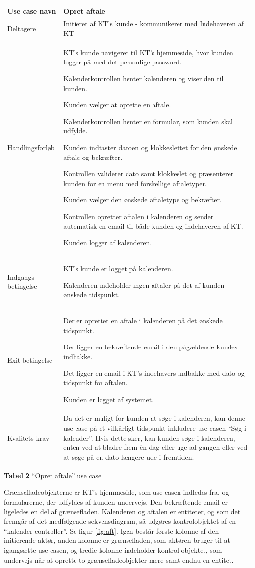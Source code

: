 \documentclass[12pt]{article}   %
\newcommand{\nextitem}{\par\hspace*{\labelsep}\textbullet\hspace*{\labelsep}}
\begin{document}
\begin{tabular}{l p{10cm}}
Use case navn & Opret aftale \\ \hline
Deltagere & \nextitem Initieret af KT's kunde
            - kommunikerer med Indehaveren af KT\\ \hline
Handlingsforløb &
	\nextitem KT's kunde navigerer til KT's hjemmeside, hvor kunden logger
	på med det personlige password.
	\nextitem Kalenderkontrollen henter kalenderen og viser den til
	kunden.
	\nextitem Kunden vælger at oprette en aftale.
	\nextitem Kalenderkontrollen henter en formular, som kunden skal
	udfylde.
	\nextitem Kunden indtaster datoen og klokkeslettet for den ønskede 
	aftale og bekræfter.
	\nextitem Kontrollen validerer dato samt klokkeslet og præsenterer
	kunden for en menu med forskellige aftaletyper.
	\nextitem Kunden vælger den ønskede aftaletype og bekræfter.
	\nextitem Kontrollen opretter aftalen i kalenderen og sender
	automatisk en email til både kunden og indehaveren af KT. 
	\nextitem Kunden logger af kalenderen.
	\\ \hline
	Indgangs betingelse &
		\nextitem KT's kunde er logget på kalenderen. 
		\nextitem Kalenderen indeholder ingen aftaler på det af kunden
		ønskede tidspunkt.
		\\ \hline
Exit betingelse & 
	\nextitem Der er oprettet en aftale i kalenderen på det ønskede
	tidspunkt. 
		\nextitem Der ligger en bekræftende email i den pågældende kundes
			indbakke.
		\nextitem Det ligger en email i KT's indehavers
			indbakke med dato og tidspunkt for aftalen. 
		\nextitem Kunden er logget af systemet.\\ \hline
		Kvalitets krav & Da det er muligt for kunden at søge i
		kalenderen, kan denne use case på et vilkårligt tidspunkt
		inkludere use casen  ``Søg i kalender''. Hvis dette sker, kan
		kunden søge i kalenderen, enten ved at bladre frem èn dag eller uge
		ad gangen eller ved at søge på en dato længere ude i
		fremtiden.\\ \hline
\end{tabular}
\begin{center}
\textbf{Tabel 2} ``Opret aftale'' use case.
\end{center}
\vspace{0.5cm}


Grænsefladeobjekterne er KT's hjemmeside, som use casen indledes fra, og
formularerne, der udfyldes af kunden undervejs. Den bekræftende email er
ligeledes en del af grænsefladen. Kalenderen og aftalen er entiteter, og som
det fremgår af det medfølgende sekvensdiagram, så udgøres kontrolobjektet af en
``kalender controller''. Se figur \ref{fig:aft}. 
Igen består første kolonne af den initierende aktør, anden kolonne er
grænsefladen, som aktøren bruger til at igangsætte use casen, og tredie
kolonne indeholder kontrol objektet, som undervejs når at oprette to
grænsefladeobjekter mere samt endnu en entitet.
\end{document}
